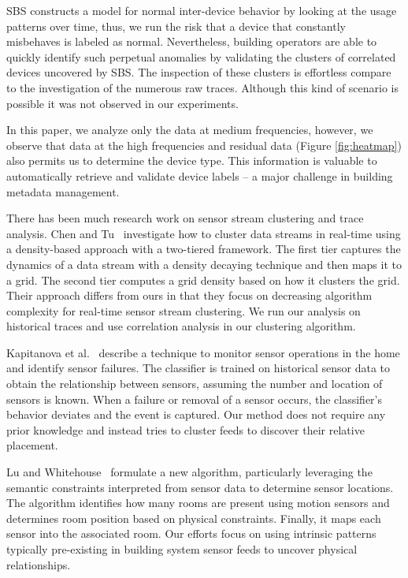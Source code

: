 SBS constructs a model for normal inter-device behavior by looking at the usage patterns over time, thus, we run the risk that
a device that constantly misbehaves is labeled as normal.  %
Nevertheless, building operators are able to quickly identify such perpetual anomalies by validating the clusters of correlated devices uncovered by SBS.
The inspection of these clusters is effortless compare to the investigation of the numerous raw traces.  
Although this kind of scenario is possible it was not observed in our experiments.

In this paper, we analyze only the data at medium frequencies, however, we observe that data at the high frequencies and residual data (Figure \ref{fig:heatmap}) also permits us to determine the device type.  %
This information is valuable to automatically retrieve and validate device labels -- a major challenge in building metadata
management.

There has been much research work on sensor stream clustering and trace analysis. Chen and Tu~\cite{DStream} investigate 
how to cluster data streams in real-time using a density-based approach with a two-tiered framework. The first tier captures 
the dynamics of a data stream with a density decaying technique and then maps it to a grid.  The second tier computes a grid 
density based on how it clusters the grid. Their approach differs from ours in that they focus on decreasing algorithm 
complexity for real-time sensor stream clustering.  We run our analysis on historical traces and use correlation analysis
in our clustering algorithm.

Kapitanova et al.~\cite{failure} describe a technique to monitor sensor operations in the home and identify sensor failures. 
The classifier is trained on historical sensor data to obtain the relationship between sensors, assuming the number and location of 
sensors is known.  When a failure or removal of a sensor occurs, the classifier's behavior deviates and the event is captured. Our method does not require any prior knowledge and instead tries to cluster feeds to discover their relative placement.

Lu and Whitehouse~\cite{blueprints} formulate a new algorithm, particularly leveraging the semantic constraints interpreted from sensor 
data to determine sensor locations. The algorithm identifies how many rooms are present using motion sensors and determines room position based on physical constraints. Finally, it maps each sensor into the associated room. Our efforts focus on using intrinsic patterns typically pre-existing in building system sensor feeds to uncover physical relationships.

